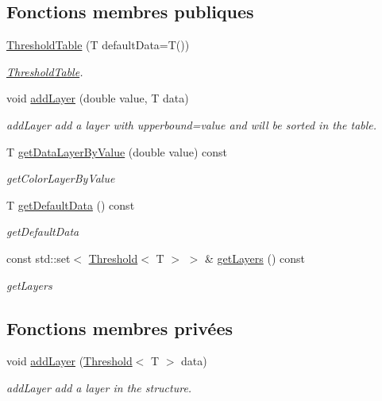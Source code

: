 \subsection*{Fonctions membres publiques}
\begin{DoxyCompactItemize}
\item 
\hyperlink{class_threshold_table_aed8c318959eca9a7f33944a8300b3e6a}{Threshold\+Table} (T default\+Data=T())
\begin{DoxyCompactList}\small\item\em \hyperlink{class_threshold_table}{Threshold\+Table}. \end{DoxyCompactList}\item 
void \hyperlink{class_threshold_table_a8724b07d34b3b1c84d4e6e6f2afdad37}{add\+Layer} (double value, T data)
\begin{DoxyCompactList}\small\item\em add\+Layer add a layer with upperbound=value and will be sorted in the table. \end{DoxyCompactList}\item 
T \hyperlink{class_threshold_table_a4d666178969016311a474841e4538a71}{get\+Data\+Layer\+By\+Value} (double value) const
\begin{DoxyCompactList}\small\item\em get\+Color\+Layer\+By\+Value \end{DoxyCompactList}\item 
T \hyperlink{class_threshold_table_a8db6671717f413e500301520310ccc74}{get\+Default\+Data} () const
\begin{DoxyCompactList}\small\item\em get\+Default\+Data \end{DoxyCompactList}\item 
const std\+::set$<$ \hyperlink{struct_threshold}{Threshold}$<$ T $>$ $>$ \& \hyperlink{class_threshold_table_a6cb1745a571a4e071e9b74ad34372405}{get\+Layers} () const
\begin{DoxyCompactList}\small\item\em get\+Layers \end{DoxyCompactList}\end{DoxyCompactItemize}
\subsection*{Fonctions membres privées}
\begin{DoxyCompactItemize}
\item 
void \hyperlink{class_threshold_table_a0323e0da4f0a97b1b3f84c1d2ae7a5b2}{add\+Layer} (\hyperlink{struct_threshold}{Threshold}$<$ T $>$ data)
\begin{DoxyCompactList}\small\item\em add\+Layer add a layer in the structure. \end{DoxyCompactList}\end{DoxyCompactItemize}

